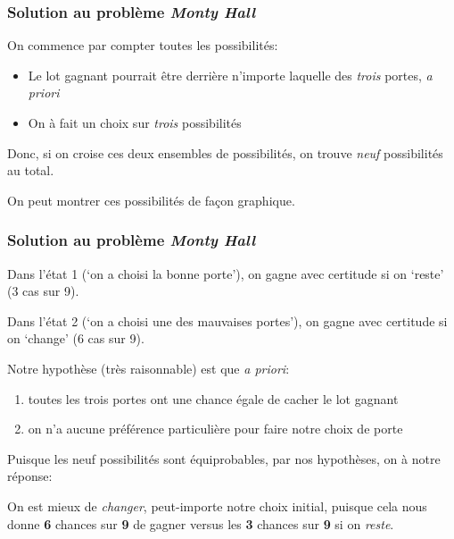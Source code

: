 \documentclass{beamer}
\begin{document}
\begin{frame}
    \frametitle{Solution au problème \emph{Monty Hall}}
    On commence par compter toutes les possibilités: \pause
    \begin{itemize}
      \item Le lot gagnant pourrait être derrière n’importe laquelle
            des \emph{trois} portes, \emph{a priori} \pause
      \item On à fait un choix sur \emph{trois} possibilités
    \end{itemize}

    \bigskip \pause

    Donc, si on croise ces deux ensembles de possibilités,
    on trouve \emph{neuf} possibilités au total.\\

    \bigskip \pause

    On peut montrer ces possibilités de façon graphique.
\end{frame}


\begin{frame}
    \begin{figure}
      \centering
      \scalebox{0.60}{}
    \end{figure}
\end{frame}


\begin{frame}
    \frametitle{Solution au problème \emph{Monty Hall}}
    Dans l’état 1 (‘on a choisi la bonne porte’),
    on gagne avec certitude si on ‘reste’ (3 cas sur 9).\\

    \vfill \pause

    Dans l’état 2 (‘on a choisi une des mauvaises portes’),
    on gagne avec certitude si on ‘change’ (6 cas sur 9).\\

    \vfill \pause

    Notre hypothèse (très raisonnable) est que \emph{a priori}:
    \begin{enumerate}
      \item toutes les trois portes ont une chance égale de cacher le lot gagnant
      \item on n’a aucune préférence particulière pour faire notre choix de porte
    \end{enumerate}

    \vfill \pause

    Puisque les neuf possibilités sont équiprobables, par nos hypothèses, on à notre réponse:\\

    \vfill \pause

    On est mieux de \emph{changer}, peut-importe notre choix initial,
    puisque cela nous donne \textbf{6} chances sur \textbf{9} de gagner
    versus les \textbf{3} chances sur \textbf{9} si on \emph{reste}.
\end{frame}
\end{document}
